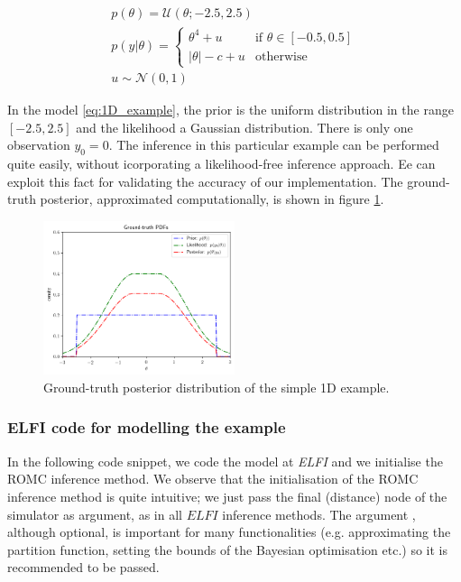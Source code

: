 \begin{gather} \label{eq:1D_example} p(\theta) =
\mathcal{U}(\theta;-2.5,2.5)\\ p(y|\theta) = \left\{
    \begin{array}{ll} \theta^4 + u & \mbox{if } \theta \in [-0.5, 0.5]
\\ |\theta| - c + u & \mbox{otherwise}
    \end{array} \right.\\ u \sim \mathcal{N}(0,1)
\end{gather}

\noindent

In the model \eqref{eq:1D_example}, the prior is the uniform
distribution in the range $[-2.5, 2.5]$ and the likelihood a Gaussian
distribution. There is only one observation $y_0 = 0$. The inference
in this particular example can be performed quite easily, without
icorporating a likelihood-free inference approach. Ee can exploit this
fact for validating the accuracy of our implementation. The
ground-truth posterior, approximated computationally, is shown in
figure \ref{fig:example_gt}.

\begin{figure}[h]
    \begin{center}
\includegraphics[width=0.5\textwidth]{./Thesis/images/chapter3/example_gt.png}
    \end{center}
  \caption[Ground-truth posterior distribution of the simple 1D
example.]{Ground-truth posterior distribution of the simple 1D
example.}
  \label{fig:example_gt}
\end{figure}

\subsubsection*{ELFI code for modelling the example}

In the following code snippet, we code the model at \textit{ELFI} and
we initialise the ROMC inference method. We observe that the
initialisation of the ROMC inference method is quite intuitive; we
just pass the final (distance) node of the simulator as argument, as
in all $\textit{ELFI}$ inference methods. The argument
, although optional, is important for many
functionalities (e.g. approximating the partition function, setting
the bounds of the Bayesian optimisation etc.) so it is recommended to
be passed.

